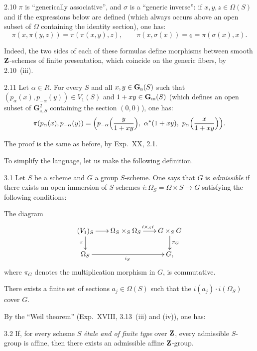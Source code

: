 \begin{corollary}{2.10}\label{XXV.2.10}
$\pi$ is ``generically associative'', and $\sigma$ is a ``generic inverse'': if $x,y,z\in\Omega(S)$ and if the expressions below are defined (which always occurs above an open subset of $\Omega$ containing the identity section), one has:
\[
\pi(x,\pi(y,z))=\pi(\pi(x,y),z),\qquad
\pi(x,\sigma(x))=\underline e=\pi(\sigma(x),x).
\]
\end{corollary}
Indeed, the two sides of each of these formulas define morphisms between smooth $\mathbf{Z}$-schemes of finite presentation, which coincide on the generic fibers, by 2.10~(iii).
\begin{corollary}{2.11}\label{XXV.2.11}
Let $\alpha\in R$. For every $S$ and all $x,y\in\mathbf{G}_{\mathrm{a}}(S)$ such that $(p_\alpha(x),p_{-\alpha}(y))\in V_1(S)$ and $1+xy\in\mathbf{G}_{\mathrm{m}}(S)$ (which defines an open subset of $\mathbf G_{\mathrm a,S}^2$ containing the section $(0,0)$), one has:
\[
\pi(p_\alpha(x),p_{-\alpha}(y))=
\Bigl(p_{-\alpha}\Bigl(\frac{y}{1+xy}\Bigr),\ \alpha^*(1+xy),\ p_\alpha\Bigl(\frac{x}{1+xy}\Bigr)\Bigr).
\]
\end{corollary}
The proof is the same as before, by Exp.~XX, 2.1.

To simplify the language, let us make the following definition.
\begin{definition}{3.1}\label{XXV.3.1}
Let $S$ be a scheme and $G$ a group $S$-scheme. One says that $G$ is \emph{admissible} if there exists an open immersion of $S$-schemes $i:\Omega_S=\Omega\times S\to G$ satisfying the following conditions:
\begin{enumeratei}
\item The diagram
\[
\xymatrix@C=18pt@R=18pt{
(V_1)_S\ar[r]\ar[d]_{\pi}&\Omega_S\times_S\Omega_S\ar[r]^{i\times_S i}&G\times_S G\ar[d]^{\pi_G}\\
\Omega_S\ar[rr]_{i_S}&&G,
}
\]
where $\pi_G$ denotes the multiplication morphism in $G$, is commutative.
\item There exists a finite set of sections $a_j\in\Omega(S)$ such that the $i(a_j)\cdot i(\Omega_S)$ cover $G$.
\end{enumeratei}
\end{definition}
By the ``Weil theorem'' (Exp.~XVIII, 3.13~(iii) and (iv)), one has:
\begin{lemma}{3.2}\label{XXV.3.2}
If, for every scheme $S$ \emph{\'etale and of finite type} over $\mathbf{Z}$, every admissible $S$-group is affine, then there exists an admissible affine $\mathbf{Z}$-group.
\end{lemma}
